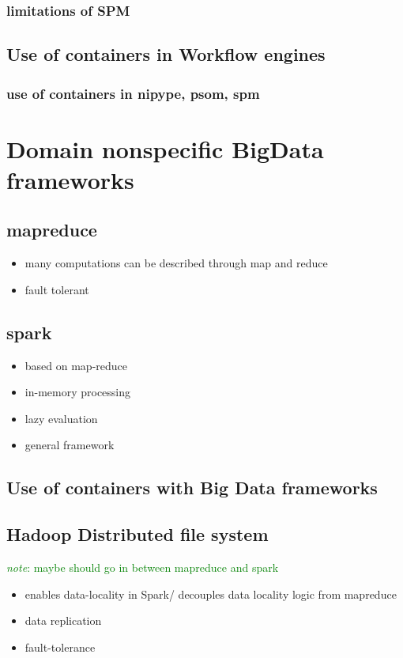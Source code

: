\documentclass{report}
\newcommand{\note}[1]{\textcolor{green}{\textit{note}: #1}}
\begin{document}
		\subsection{limitations of SPM}
	\section{Use of containers in Workflow engines}
		\subsection{use of containers in nipype, psom, spm}
		
\chapter{Domain nonspecific BigData frameworks}
	\section{mapreduce}
		\begin{itemize}
			\item many computations can be described through map and reduce
			\item fault tolerant
		\end{itemize}
	\section{spark}
		\begin{itemize}
			\item based on map-reduce
			\item in-memory processing
			\item lazy evaluation
			\item general framework
		\end{itemize}
	\section{Use of containers with Big Data frameworks}
	\section{Hadoop Distributed file system}
		\note{maybe should go in between mapreduce and spark}
		\begin{itemize}
			\item enables data-locality in Spark/ decouples data locality logic from mapreduce\
			\item data replication
			\item fault-tolerance
		\end{itemize}
\end{document}
